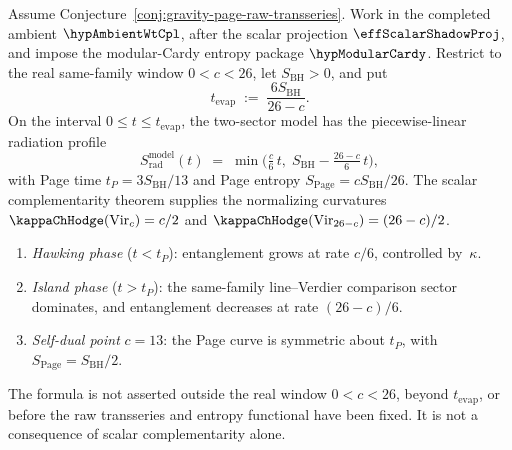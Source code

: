 \begin{proposition}
\label{prop:gravity-page-curve}
Assume Conjecture~\ref{conj:gravity-page-raw-transseries}. Work in
the completed ambient $\hypAmbientWtCpl$, after the scalar projection
$\effScalarShadowProj$, and impose the modular-Cardy entropy package
$\hypModularCardy$. Restrict to the real same-family window
$0<c<26$, let $S_{\mathrm{BH}}>0$, and put
\[
t_{\mathrm{evap}}
\;:=\;
\frac{6S_{\mathrm{BH}}}{26-c}.
\]
On the interval $0\le t\le t_{\mathrm{evap}}$, the two-sector model
has the piecewise-linear radiation profile
\begin{equation}\label{eq:gravity-page-curve}
S_{\mathrm{rad}}^{\mathrm{model}}(t)
\;=\;
\min\!\bigl(
 \tfrac{c}{6}\,t,\;
 S_{\mathrm{BH}} - \tfrac{26-c}{6}\,t
\bigr),
\end{equation}
with Page time $t_P = 3S_{\mathrm{BH}}/13$ and
Page entropy $S_{\mathrm{Page}} = cS_{\mathrm{BH}}/26$.
The scalar complementarity theorem supplies the normalizing
curvatures
$\kappaChHodge(\mathrm{Vir}_c) = c/2$ and
$\kappaChHodge(\mathrm{Vir}_{26-c}) = (26-c)/2$.
\begin{enumerate}[label=\textup{(\roman*)}]
\item \emph{Hawking phase} ($t < t_P$):
 entanglement grows at rate $c/6$, controlled by~$\kappa$.
\item \emph{Island phase} ($t > t_P$):
 the same-family line--Verdier comparison sector dominates,
 and entanglement decreases at rate $(26-c)/6$.
\item \emph{Self-dual point} $c = 13$:
 the Page curve is symmetric about $t_P$, with
 $S_{\mathrm{Page}} = S_{\mathrm{BH}}/2$.
\end{enumerate}
The formula is not asserted outside the real window $0<c<26$, beyond
$t_{\mathrm{evap}}$, or before the raw transseries and entropy
functional have been fixed. It is not a consequence of scalar
complementarity alone.
\end{proposition}

